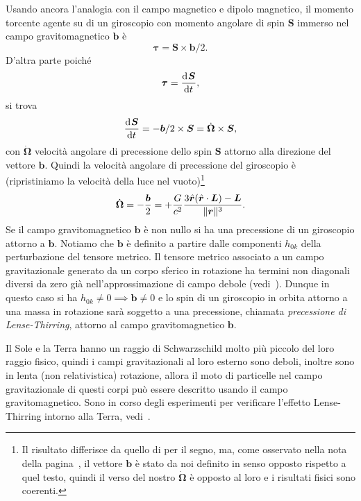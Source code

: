 Usando ancora l'analogia con il campo magnetico e dipolo magnetico,
il momento torcente agente su di un giroscopio con momento angolare di spin
$\bm{S}$ immerso nel campo gravitomagnetico $\bm{b}$ è
\begin{equation}
  \bm{\tau} = \bm{S} \times \bm{b}/2.
\end{equation}
D'altra parte poiché
\begin{equation}
  \bm{\tau} = \frac{{\mathop{}\!\mathrm{d}^{}}\bm{S}}{\mathop{}\!\mathrm{d} {t}^{}},
\end{equation}
si trova
\begin{equation}
  \frac{{\mathop{}\!\mathrm{d}^{}}\bm{S}}{\mathop{}\!\mathrm{d} {t}^{}} = - \bm{b}/2 \times \bm{S} = \dot{\bm{\Omega}} \times
  \bm{S},
\end{equation}
con $\dot{\bm{\Omega}}$ velocità angolare di precessione dello spin $\bm{S}$
attorno alla direzione del vettore $\bm{b}$.  Quindi la velocità angolare
di precessione del giroscopio è (ripristiniamo la velocità della luce nel
vuoto)\footnote{Il risultato differisce da quello di
  \textcite[193]{ohanian:gravitazione} per il segno, ma, come osservato nella
  nota della pagina~\pageref{nota-b}, il vettore $\bm{b}$ è stato da noi
  definito in senso opposto rispetto a quel testo, quindi il verso del nostro
  $\dot{\bm{\Omega}}$ è opposto al loro e i risultati fisici sono coerenti.}
\begin{equation}
  \dot{\bm{\Omega}} = -\frac{\bm{b}}{2} =
  + \frac{G}{c^{2}}\frac{3\hat{\bm{r}}(\hat{\bm{r}} \cdot \bm{L}) -
    \bm{L}}{\lVert\bm{r}\rVert^{3}}.
\end{equation}
Se il campo gravitomagnetico $\bm{b}$ è non nullo si ha una precessione di un
giroscopio attorno a $\bm{b}$.  Notiamo che $\bm{b}$ è definito a partire dalle
componenti $h_{0k}$ della perturbazione del tensore metrico.  Il tensore metrico
associato a un campo gravitazionale generato da un corpo sferico in rotazione ha
termini non diagonali diversi da zero già nell'approssimazione di campo debole
(vedi~\textcite[192]{ohanian:gravitazione}).  Dunque in questo caso si ha
$h_{0k} \neq 0 \implies \bm{b} \neq 0$ e lo spin di un giroscopio in orbita
attorno a una massa in rotazione sarà soggetto a una precessione, chiamata
 \emph{precessione di Lense-Thirring},
attorno al campo gravitomagnetico $\bm{b}$.

Il Sole e la Terra hanno un raggio di Schwarzschild molto più piccolo del loro
raggio fisico, quindi i campi gravitazionali al loro esterno sono deboli,
inoltre sono in lenta (non relativistica) rotazione, allora il moto di
particelle nel campo gravitazionale di questi corpi può essere descritto usando
il campo gravitomagnetico.  Sono in corso degli esperimenti per verificare
l'effetto Lense-Thirring intorno alla Terra,
vedi~\textcite[193-195]{ohanian:gravitazione}.

